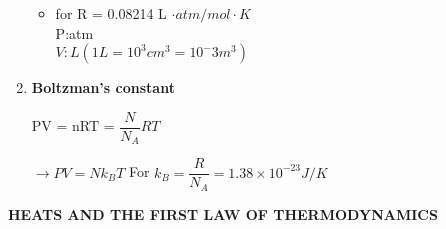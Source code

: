 \documentclass[10pt]{article}
\begin{document}
\begin{enumerate}
\begin{itemize}
	\item for R = 0.08214 L $\cdot atm/mol \cdot K$\\
	    P:atm\\
	    $V:L(1L = 10^3 cm^3 = 10^-3 m^3)$\\
	\end{itemize}
	\item \textbf{Boltzman's constant}
      \begin{mybox}
	\begin{center}
	PV = nRT = $\dfrac{N}{N_A} RT$\\
       \end{center}
       \end{mybox}
	$\rightarrow{PV = Nk_BT}$
	For $k_B = \dfrac{R}{N_A} = 1.38 \times 10^{-23} J/K$ 
\end{enumerate}
\pagebreak
\begin{center}
\textbf{HEATS AND THE FIRST LAW OF THERMODYNAMICS}
\end{center}
\end{document}
